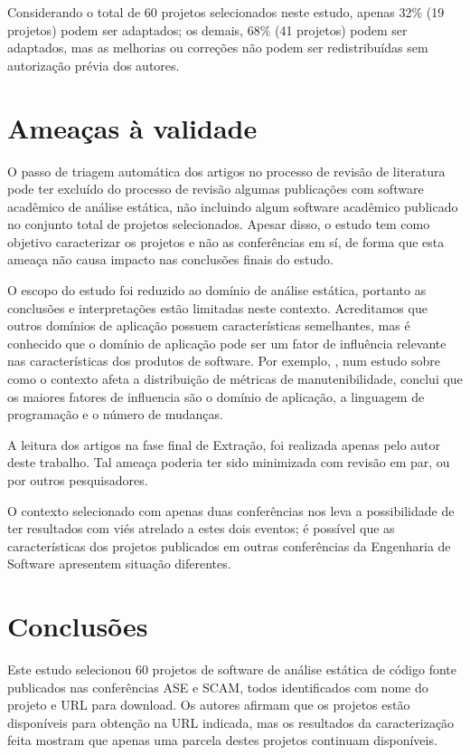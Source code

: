 Considerando o total de 60 projetos selecionados neste estudo, apenas 32\% (19
projetos) podem ser adaptados; os demais, 68\% (41 projetos) podem ser
adaptados, mas as melhorias ou correções não podem ser redistribuídas sem
autorização prévia dos autores.

\section{Ameaças à validade}

O passo de triagem automática dos artigos no processo de revisão de literatura
pode ter excluído do processo de revisão algumas publicações com software
acadêmico de análise estática, não incluindo algum software acadêmico publicado no conjunto total de projetos
selecionados. Apesar disso, o estudo tem como objetivo
caracterizar os projetos e não as conferências em sí, de forma que esta ameaça
não causa impacto nas conclusões finais do estudo.

O escopo do estudo foi reduzido ao domínio de análise estática, portanto as
conclusões e interpretações estão limitadas neste contexto. Acreditamos que
outros domínios de aplicação possuem características semelhantes, mas é
conhecido que o domínio de aplicação pode ser um fator de influência relevante nas
características dos produtos de software.
Por exemplo, , num estudo sobre como o contexto afeta
a distribuição de métricas de manutenibilidade, conclui que os maiores fatores
de influencia são o domínio de aplicação, a linguagem de programação e o número
de mudanças.

A leitura dos artigos na fase final de Extração, foi realizada
apenas pelo autor deste trabalho. Tal ameaça poderia ter sido minimizada com
revisão em par, ou por outros pesquisadores.

O contexto selecionado com apenas duas conferências nos leva a possibilidade de
ter resultados com viés atrelado a estes dois eventos; é possível que as
características dos projetos publicados em outras conferências da Engenharia de
Software apresentem situação diferentes.

\section{Conclusões} \label{estudo1:conclusoes}

Este estudo selecionou 60 projetos de software de análise estática de código
fonte publicados nas conferências ASE e SCAM, todos identificados com nome do
projeto e URL para download. Os autores afirmam que os projetos estão
disponíveis para obtenção na URL indicada, mas os resultados da caracterização
feita mostram que apenas uma parcela destes projetos continuam disponíveis.

